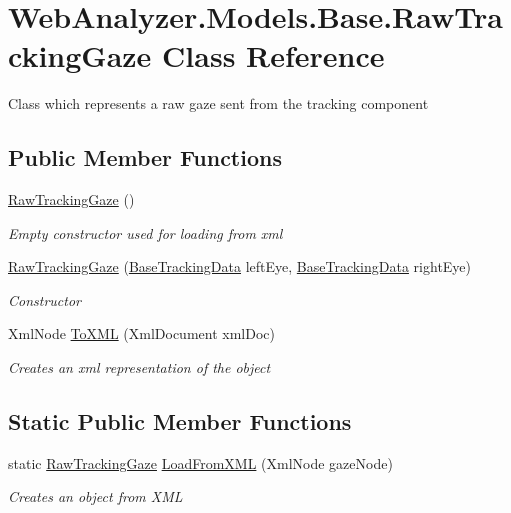 \hypertarget{class_web_analyzer_1_1_models_1_1_base_1_1_raw_tracking_gaze}{}\section{Web\+Analyzer.\+Models.\+Base.\+Raw\+Tracking\+Gaze Class Reference}
\label{class_web_analyzer_1_1_models_1_1_base_1_1_raw_tracking_gaze}


Class which represents a raw gaze sent from the tracking component  


\subsection*{Public Member Functions}
\begin{DoxyCompactItemize}
\item 
\hyperlink{class_web_analyzer_1_1_models_1_1_base_1_1_raw_tracking_gaze_a5fa23875741ccd08b26a5b66721f3822}{Raw\+Tracking\+Gaze} ()
\begin{DoxyCompactList}\small\item\em Empty constructor used for loading from xml \end{DoxyCompactList}\item 
\hyperlink{class_web_analyzer_1_1_models_1_1_base_1_1_raw_tracking_gaze_aa36c796e4cea747e212c785a2cddd08f}{Raw\+Tracking\+Gaze} (\hyperlink{class_web_analyzer_1_1_models_1_1_base_1_1_base_tracking_data}{Base\+Tracking\+Data} left\+Eye, \hyperlink{class_web_analyzer_1_1_models_1_1_base_1_1_base_tracking_data}{Base\+Tracking\+Data} right\+Eye)
\begin{DoxyCompactList}\small\item\em Constructor \end{DoxyCompactList}\item 
Xml\+Node \hyperlink{class_web_analyzer_1_1_models_1_1_base_1_1_raw_tracking_gaze_a0de790ba2edb091bde241007be981427}{To\+X\+M\+L} (Xml\+Document xml\+Doc)
\begin{DoxyCompactList}\small\item\em Creates an xml representation of the object \end{DoxyCompactList}\end{DoxyCompactItemize}
\subsection*{Static Public Member Functions}
\begin{DoxyCompactItemize}
\item 
static \hyperlink{class_web_analyzer_1_1_models_1_1_base_1_1_raw_tracking_gaze}{Raw\+Tracking\+Gaze} \hyperlink{class_web_analyzer_1_1_models_1_1_base_1_1_raw_tracking_gaze_a2a7621cda0221f638008c67561d17f3a}{Load\+From\+X\+M\+L} (Xml\+Node gaze\+Node)
\begin{DoxyCompactList}\small\item\em Creates an object from X\+M\+L \end{DoxyCompactList}\end{DoxyCompactItemize}
